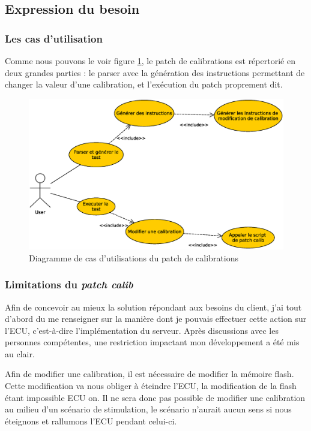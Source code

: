 \subsection{Expression du besoin}\label{besoin-patch}
\subsubsection{Les cas d'utilisation}
		Comme nous pouvons le voir figure \ref{fig:patch-cal-usecase}, le patch de calibrations est répertorié en deux grandes parties : le parser avec la génération des instructions permettant de changer la valeur d'une calibration, et l'exécution du patch proprement dit.
		\begin{figure}[H]
			\centering
			\includegraphics[width=12cm]{contents/images/patch-cal_usecase.eps}
			\caption{Diagramme de cas d'utilisations du patch de calibrations}
			\label{fig:patch-cal-usecase}
		\end{figure}

		\subsubsection{Limitations du \textit{patch calib}}\label{ecustop}
		Afin de concevoir au mieux la solution répondant aux besoins du client, j'ai tout d'abord du me renseigner sur la manière dont je pouvais effectuer cette action sur l'ECU, c'est-à-dire l'implémentation du serveur. Après discussions avec les personnes compétentes, une restriction impactant mon développement a été mis au clair.
		
		Afin de modifier une calibration, il est nécessaire de modifier la mémoire flash. Cette modification va nous obliger à éteindre l'ECU, la modification de la flash étant impossible ECU on. Il ne sera donc pas possible de modifier une calibration au milieu d'un scénario de stimulation, le scénario n'aurait aucun sens si nous éteignons et rallumons l'ECU pendant celui-ci.
		
